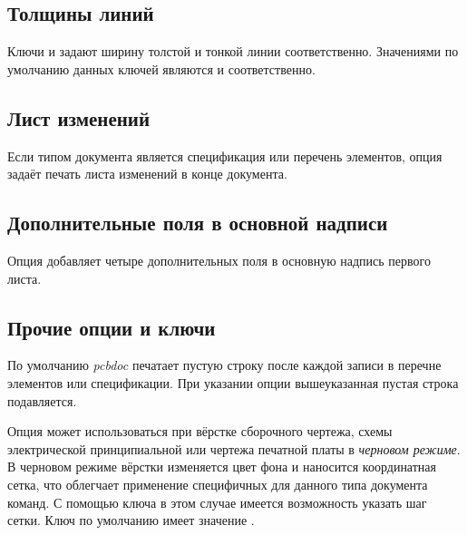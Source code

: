 \subsection{Толщины линий}

Ключи  и  задают ширину толстой и
тонкой линии соответственно. Значениями по умолчанию данных ключей являются
\bfsf{0.6mm} и \bfsf{0.3mm} соответственно.

\subsection{Лист изменений}

Если типом документа является спецификация или перечень элементов, опция
 задаёт печать листа изменений в конце документа.\sloppy

\fussy
\subsection{Дополнительные поля в основной надписи}

Опция  добавляет четыре дополнительных поля в основную надпись первого
листа.

\subsection{Прочие опции и ключи}

По умолчанию \emph{pcbdoc} печатает пустую строку после каждой записи в перечне
элементов или спецификации. При указании опции  вышеуказанная пустая
строка подавляется.

Опция  может использоваться при вёрстке сборочного чертежа, схемы
электрической принципиальной или чертежа печатной платы в \emph{черновом режиме}. В
черновом режиме вёрстки изменяется цвет фона и наносится координатная сетка, что
облегчает применение специфичных для данного типа документа команд. С помощью ключа
 в этом случае имеется возможность указать шаг сетки. Ключ
 по умолчанию имеет значение \bfsf{10mm}.
